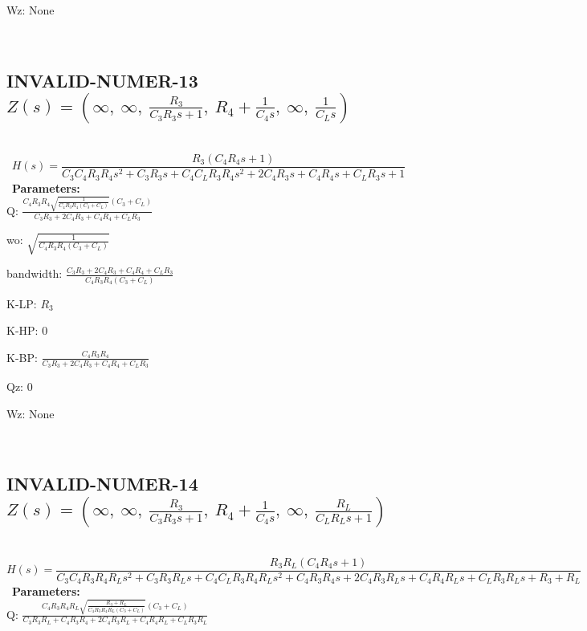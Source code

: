 \documentclass{article}
\begin{document}
Wz: $\text{None}$\ 

\ 

\subsection{INVALID-NUMER-13 $Z(s) = \left( \infty, \  \infty, \  \frac{R_{3}}{C_{3} R_{3} s + 1}, \  R_{4} + \frac{1}{C_{4} s}, \  \infty, \  \frac{1}{C_{L} s}\right)$ } \ 
\textbf{\[H(s) = \frac{R_{3} \left(C_{4} R_{4} s + 1\right)}{C_{3} C_{4} R_{3} R_{4} s^{2} + C_{3} R_{3} s + C_{4} C_{L} R_{3} R_{4} s^{2} + 2 C_{4} R_{3} s + C_{4} R_{4} s + C_{L} R_{3} s + 1}\] } \ 
\textbf{Parameters:}\\ 

Q: $\frac{C_{4} R_{3} R_{4} \sqrt{\frac{1}{C_{4} R_{3} R_{4} \left(C_{3} + C_{L}\right)}} \left(C_{3} + C_{L}\right)}{C_{3} R_{3} + 2 C_{4} R_{3} + C_{4} R_{4} + C_{L} R_{3}}$\ 

wo: $\sqrt{\frac{1}{C_{4} R_{3} R_{4} \left(C_{3} + C_{L}\right)}}$\ 

bandwidth: $\frac{C_{3} R_{3} + 2 C_{4} R_{3} + C_{4} R_{4} + C_{L} R_{3}}{C_{4} R_{3} R_{4} \left(C_{3} + C_{L}\right)}$\ 

K-LP: $R_{3}$\ 

K-HP: $0$\ 

K-BP: $\frac{C_{4} R_{3} R_{4}}{C_{3} R_{3} + 2 C_{4} R_{3} + C_{4} R_{4} + C_{L} R_{3}}$\ 

Qz: $0$\ 

Wz: $\text{None}$\ 

\ 

\subsection{INVALID-NUMER-14 $Z(s) = \left( \infty, \  \infty, \  \frac{R_{3}}{C_{3} R_{3} s + 1}, \  R_{4} + \frac{1}{C_{4} s}, \  \infty, \  \frac{R_{L}}{C_{L} R_{L} s + 1}\right)$ } \ 
\textbf{\[H(s) = \frac{R_{3} R_{L} \left(C_{4} R_{4} s + 1\right)}{C_{3} C_{4} R_{3} R_{4} R_{L} s^{2} + C_{3} R_{3} R_{L} s + C_{4} C_{L} R_{3} R_{4} R_{L} s^{2} + C_{4} R_{3} R_{4} s + 2 C_{4} R_{3} R_{L} s + C_{4} R_{4} R_{L} s + C_{L} R_{3} R_{L} s + R_{3} + R_{L}}\] } \ 
\textbf{Parameters:}\\ 

Q: $\frac{C_{4} R_{3} R_{4} R_{L} \sqrt{\frac{R_{3} + R_{L}}{C_{4} R_{3} R_{4} R_{L} \left(C_{3} + C_{L}\right)}} \left(C_{3} + C_{L}\right)}{C_{3} R_{3} R_{L} + C_{4} R_{3} R_{4} + 2 C_{4} R_{3} R_{L} + C_{4} R_{4} R_{L} + C_{L} R_{3} R_{L}}$\ 
\end{document}
